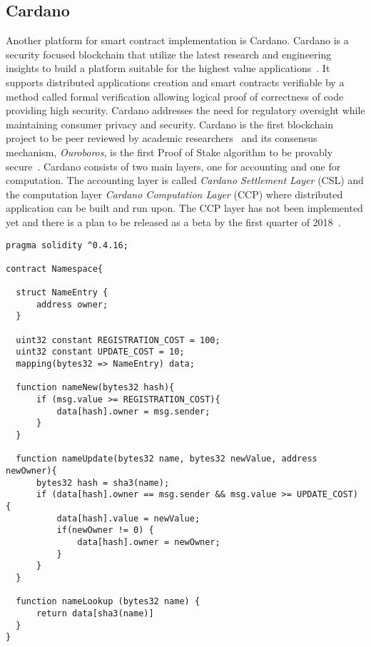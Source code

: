 \subsection{Cardano}\label{blockchain:impl:cardano}

Another platform for smart contract implementation is Cardano. Cardano is a security focused blockchain that utilize the latest research and engineering insights to build a platform suitable for the highest value applications~\cite{cardano_site}. It supports distributed applications creation and smart contracts verifiable by a method called formal verification allowing logical proof of correctness of code providing high security. Cardano addresses the need for regulatory oversight while maintaining consumer privacy and security. Cardano is the first blockchain project to be peer reviewed by academic researchers~\cite{cardano_site} and its consensus mechanism, \textit{Ouroboros}, is the first Proof of Stake algorithm to be provably secure~\cite{Kiayias2017}. Cardano consists of two main layers, one for accounting and one for computation. The accounting layer is called \textit{Cardano Settlement Layer} (CSL)
and the computation layer \textit{Cardano Computation Layer} (CCP) where distributed application can be built and run upon. The CCP layer has not been implemented yet and there is a plan to be released as a beta by the first quarter of 2018~\cite{cardano_parsons}.

\clearpage

\begin{lstlisting}[language=Solidity, caption={An Ethereum Smart Contract}]
pragma solidity ^0.4.16;

contract Namespace{

  struct NameEntry {
      address owner;
  }

  uint32 constant REGISTRATION_COST = 100;
  uint32 constant UPDATE_COST = 10;
  mapping(bytes32 => NameEntry) data;

  function nameNew(bytes32 hash){
      if (msg.value >= REGISTRATION_COST){
          data[hash].owner = msg.sender;
      }
  }

  function nameUpdate(bytes32 name, bytes32 newValue, address newOwner){
      bytes32 hash = sha3(name);
      if (data[hash].owner == msg.sender && msg.value >= UPDATE_COST) {
          data[hash].value = newValue;
          if(newOwner != 0) {
              data[hash].owner = newOwner;
          }
      }
  }

  function nameLookup (bytes32 name) {
      return data[sha3(name)]
  }
}
\end{lstlisting}

\clearpage
